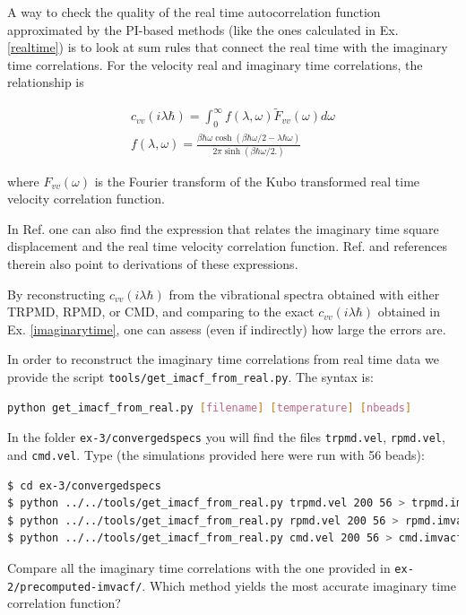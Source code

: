 \documentclass{article}
\begin{document}
\begin{Exercise}[label={relationship},title={Relationship between imaginary and real time correlations}]

A way to check the quality of the real time autocorrelation function approximated by the PI-based methods (like the ones calculated in Ex. \ref{realtime}) is to look at sum rules that connect the real time with the imaginary time correlations. For the velocity real and imaginary time correlations, the relationship is

\begin{eqnarray}
c_{vv}(i \lambda \hbar)=\int_0^\infty f(\lambda, \omega) \tilde{F}_{vv}(\omega) d\omega \\
f(\lambda, \omega)=\frac{\beta\hbar\omega\cosh(\beta\hbar\omega/2-\lambda\hbar\omega)}{2\pi\sinh(\beta\hbar\omega/2.)}
\end{eqnarray}

\noindent where $F_{vv}(\omega)$ is the Fourier transform of the Kubo transformed real time velocity correlation function.

In Ref. \cite{tuck08book} one can also find the expression that relates the imaginary time square displacement and the real time velocity correlation function. Ref. \cite{habe+07jcp} and references therein also point to derivations of these expressions. 

By reconstructing $c_{vv}(i \lambda \hbar)$ from the vibrational spectra obtained with either TRPMD, RPMD, or CMD, and comparing to the exact $c_{vv}(i \lambda \hbar)$ obtained in Ex. \ref{imaginarytime}, one can assess (even if indirectly) how large the errors are. 

In order to reconstruct the imaginary time correlations from real time data we provide the script \texttt{tools/get\_imacf\_from\_real.py}. The syntax is:

\begin{lstlisting}[language=Bash]
python get_imacf_from_real.py [filename] [temperature] [nbeads]
\end{lstlisting}

In the folder \texttt{ex-3/convergedspecs} you will find the files \texttt{trpmd.vel}, \texttt{rpmd.vel}, and \texttt{cmd.vel}. Type (the simulations provided here were run with 56 beads):

\begin{lstlisting}[language=Bash,emph={\$}]
$ cd ex-3/convergedspecs
$ python ../../tools/get_imacf_from_real.py trpmd.vel 200 56 > trpmd.imvacf
$ python ../../tools/get_imacf_from_real.py rpmd.vel 200 56 > rpmd.imvacf
$ python ../../tools/get_imacf_from_real.py cmd.vel 200 56 > cmd.imvacf
\end{lstlisting}

Compare all the imaginary time correlations with the one provided in \texttt{ex-2/precomputed-imvacf/}. Which method yields the most accurate imaginary time correlation function?


\end{Exercise}
\end{document}
